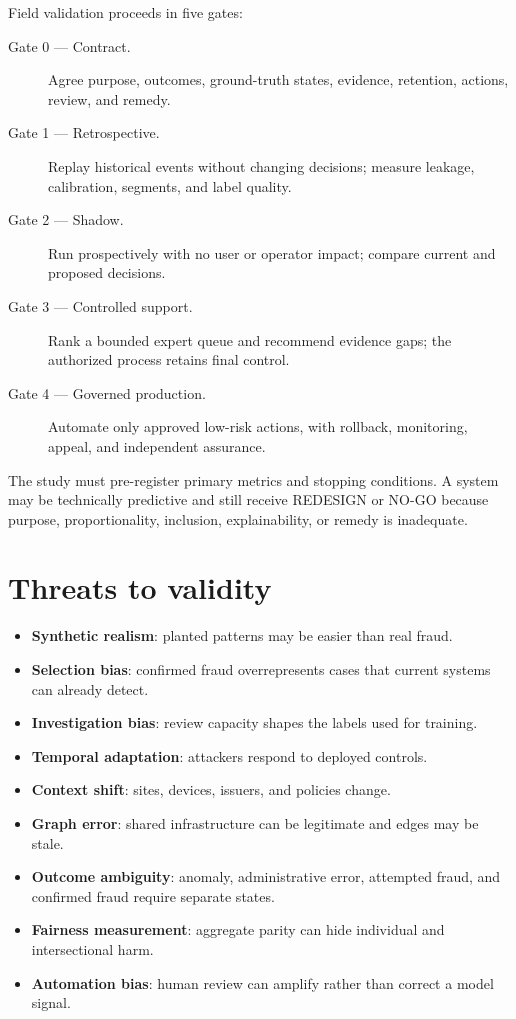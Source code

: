 Field validation proceeds in five gates:

\begin{description}
\item[Gate 0 --- Contract.] Agree purpose, outcomes, ground-truth states, evidence, retention, actions, review, and remedy.
\item[Gate 1 --- Retrospective.] Replay historical events without changing decisions; measure leakage, calibration, segments, and label quality.
\item[Gate 2 --- Shadow.] Run prospectively with no user or operator impact; compare current and proposed decisions.
\item[Gate 3 --- Controlled support.] Rank a bounded expert queue and recommend evidence gaps; the authorized process retains final control.
\item[Gate 4 --- Governed production.] Automate only approved low-risk actions, with rollback, monitoring, appeal, and independent assurance.
\end{description}

The study must pre-register primary metrics and stopping conditions. A system may be technically predictive and still receive REDESIGN or NO-GO because purpose, proportionality, inclusion, explainability, or remedy is inadequate.

\section{Threats to validity}

\begin{itemize}
\item \textbf{Synthetic realism}: planted patterns may be easier than real fraud.
\item \textbf{Selection bias}: confirmed fraud overrepresents cases that current systems can already detect.
\item \textbf{Investigation bias}: review capacity shapes the labels used for training.
\item \textbf{Temporal adaptation}: attackers respond to deployed controls.
\item \textbf{Context shift}: sites, devices, issuers, and policies change.
\item \textbf{Graph error}: shared infrastructure can be legitimate and edges may be stale.
\item \textbf{Outcome ambiguity}: anomaly, administrative error, attempted fraud, and confirmed fraud require separate states.
\item \textbf{Fairness measurement}: aggregate parity can hide individual and intersectional harm.
\item \textbf{Automation bias}: human review can amplify rather than correct a model signal.
\end{itemize}

